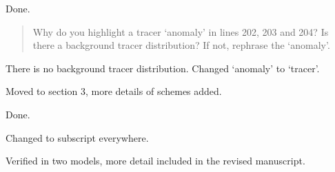 \documentclass{article}
\begin{document}
\begin{quotation}
\begin{comment}
\item Line 199: rephrase `A tracer with density $\phi$ is \ldots'
\end{comment}
\end{quotation}
Done.

\begin{quotation}
Why do you highlight a tracer `anomaly' in lines 202, 203 and 204?  Is there a background tracer distribution?  If not, rephrase the `anomaly'.
\end{quotation}
There is no background tracer distribution.  Changed `anomaly' to `tracer'.

\begin{quotation}
\begin{comment}
\item Line 211: The information about different numerical schemes is very sudden here without enough information.  Add a description and references for all numerical options in section 2.
\end{comment}
\end{quotation}
Moved to section 3, more details of schemes added.

\begin{quotation}
\begin{comment}
\item Line 223: typo: artifact
\end{comment}
\end{quotation}
Done.

\begin{quotation}
\begin{comment}
\item Eq. 14: It is highly unusual to use a superscript (instead of a subscript) for the error norm
\end{comment}
\end{quotation}
Changed to subscript everywhere.

\begin{quotation}
\begin{comment}
\item Line 247: The result that the increase of the model domain from 300 to 301km leads to a 50\% increase in the $\ell_2$ error seems to be highly questionable.  This needs to be double-checked and explained in greater detail.
\end{comment}
\end{quotation}
Verified in two models, more detail included in the revised manuscript.
\end{document}

